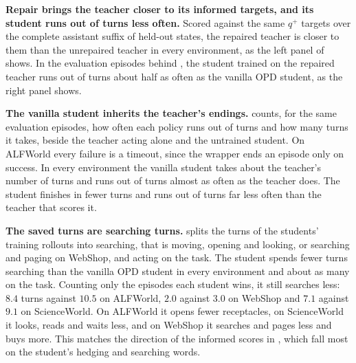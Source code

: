 \textbf{Repair brings the teacher closer to its informed targets, and its student runs out of turns less often.} Scored against the same $q^{+}$ targets over the complete assistant suffix of held-out states, the repaired teacher is closer to them than the unrepaired teacher in every environment, as the left panel of  shows. In the evaluation episodes behind , the student trained on the repaired teacher runs out of turns about half as often as the vanilla OPD student, as the right panel shows.



\textbf{The vanilla student inherits the teacher's endings.}  counts, for the same evaluation episodes, how often each policy runs out of turns and how many turns it takes, beside the teacher acting alone and the untrained student. On ALFWorld every failure is a timeout, since the wrapper ends an episode only on success. In every environment the vanilla student takes about the teacher's number of turns and runs out of turns almost as often as the teacher does. The \method{} student finishes in fewer turns and runs out of turns far less often than the teacher that scores it.

\textbf{The saved turns are searching turns.}  splits the turns of the students' training rollouts into searching, that is moving, opening and looking, or searching and paging on WebShop, and acting on the task. The \method{} student spends fewer turns searching than the vanilla OPD student in every environment and about as many on the task. Counting only the episodes each student wins, it still searches less: $8.4$ turns against $10.5$ on ALFWorld, $2.0$ against $3.0$ on WebShop and $7.1$ against $9.1$ on ScienceWorld. On ALFWorld it opens fewer receptacles, on ScienceWorld it looks, reads and waits less, and on WebShop it searches and pages less and buys more. This matches the direction of the informed scores in , which fall most on the student's hedging and searching words.


